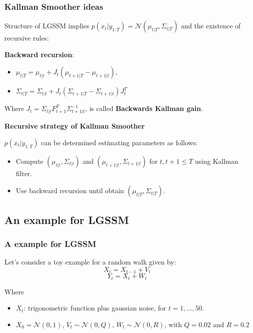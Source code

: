 \documentclass[xcolor=dvipsnames, compress]{beamer}
\begin{document}
\begin{frame}
\frametitle{Kallman Smoother ideas}

Structure of LGSSM implies $p(x_t| y_{1:T})=\mathcal{N}( \mu_{t|T}, \Sigma_{t|T}  )$ and the existence of recursive rules: \vspace{0.5cm}

\textbf{Backward recursion}:
\begin{itemize}
	\item $\mu_{t|T} = \mu_{t|t} + J_t (\mu_{t+1|T} - \mu_{t+1|t})$, 
	\item $\Sigma_{t|T} = \Sigma_{t|t} + J_t (\Sigma_{t+1|T} - \Sigma_{t+1|t})J_t^T$
\end{itemize}
\vspace{0.5cm}
Where $J_t = \Sigma_{t|t} F_{t+1}^T \Sigma_{t+1|t}^{-1}$, is called \textbf{Backwards Kallman gain}.

\end{frame}

\begin{frame}

\textbf{Recursive strategy of Kallman Smoother}

$p(x_t|y_{1:T})$ can be determined estimating parameters as follows:

\begin{itemize}
	\item Compute $(\mu_{t|t}, \Sigma_{t|t})$ and $(\mu_{t+1|t}, \Sigma_{t+1|t})$ for $t,t+1 \leq T$ using Kallman filter.
	\item Use backward recursion until obtain $(\mu_{t|T}, \Sigma_{t|T})$.
\end{itemize}
\end{frame}

\begin{frame}
\section{An example for LGSSM}
\frametitle{A example for LGSSM}
Let's consider a toy example for a random walk given by:
$$X_t = X_{t-1} + V_t $$
$$Y_t = X_{t} + W_t $$

Where 

\begin{itemize}
	\item$X_{t}$: trigonometric function plus gaussian noise, for $t=1,\ldots, 50$.
	\item $X_0 = \mathcal{N}(0,1)$, $V_t \sim \mathcal{N}(0,Q)$, $W_t \sim \mathcal{N}(0,R)$, with $Q=0.02$ and $R=0.2$
\end{itemize}



\end{frame}
\end{document}
